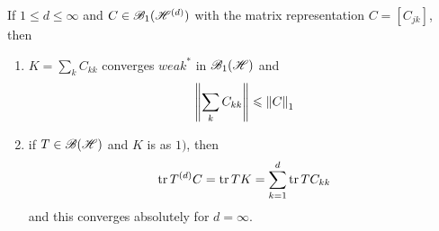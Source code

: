 \begin{prop}
	If $1 \leqslant d \leqslant \infty$ and $C \in \mathscr{B}_1(\mathscr{H}^{(d)})$ with the matrix representation $C = [C_{jk}]$, then
	\begin{enumerate}[label = \arabic*)]
		\item $K = \sum_k C_{kk}$ converges $weak^{*}$ in $\mathscr{B}_{1}\mathscr{(H)}$ and
		\begin{equation*}
			\left\lVert\sum_k C_{kk}\right\lVert \leqslant \left\lVert C\right\lVert_1
		\end{equation*}
		\item if $T \in \mathscr{B(H)}$ and $K$ is as $1)$, then
		\begin{equation*}
			\operatorname{tr}{T^{(d)}C} = \operatorname{tr}{TK} = \sum_{k=1}^{d} \operatorname{tr}{TC_{kk}}
		\end{equation*}
		and this converges absolutely for $d = \infty$.
	\end{enumerate}
\end{prop}
